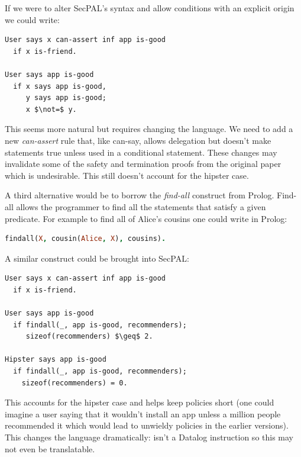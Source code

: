 \documentclass[a4paper]{article}
\begin{document}
If we were to alter SecPAL's syntax and allow conditions with an explicit origin
we could write:
\begin{lstlisting}[language=SecPAL, mathescape=true]
User says x can-assert inf app is-good
  if x is-friend.

User says app is-good
  if x says app is-good,
     y says app is-good;
     x $\not=$ y.
\end{lstlisting}
This seems more natural but requires changing the language. We need to add a new
\emph{can-assert} rule that, like can-say, allows delegation but doesn't make
statements true unless used in a conditional statement.  These changes may
invalidate some of the safety and termination proofs from the original
paper~\cite{Becker:2006vh} which is undesirable.  This still doesn't account for
the hipster case. 

A third alternative would be to borrow the \emph{find-all}
construct from Prolog. Find-all allows the programmer to find all the statements
that satisfy a given predicate.  For example to find all of Alice's cousins one
could write in Prolog:
\begin{lstlisting}[language=Prolog]
  findall(X, cousin(Alice, X), cousins).
\end{lstlisting}
A similar construct could be brought into SecPAL:
\begin{lstlisting}[language=SecPAL, mathescape=true]
User says x can-assert inf app is-good
  if x is-friend.

User says app is-good
  if findall(_, app is-good, recommenders);
     sizeof(recommenders) $\geq$ 2.

Hipster says app is-good
  if findall(_, app is-good, recommenders);
    sizeof(recommenders) = 0.
\end{lstlisting}
This accounts for the hipster case and helps keep policies short (one could
imagine a user saying that it wouldn't install an app unless a million people
recommended it which would lead to unwieldy policies in the earlier versions).
This changes the language dramatically:  isn't a Datalog
instruction so this may not even be translatable.
\end{document}
